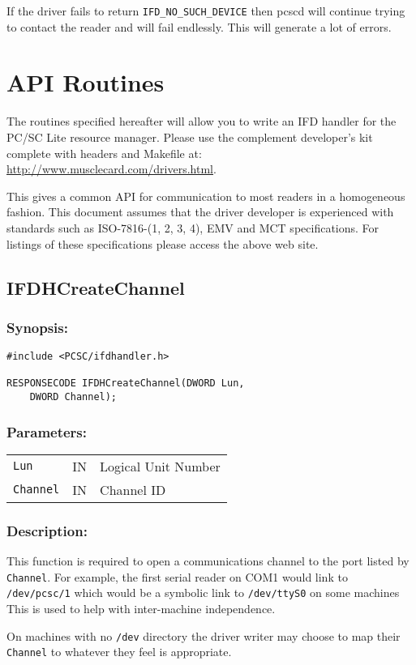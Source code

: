 \documentclass[a4paper,12pt]{article}
\newcommand{\synopsis}{\subsubsection{Synopsis:}}
\newcommand{\parameters}{\subsubsection{Parameters:}}
\newcommand{\desc}{\subsubsection{Description:}}
\begin{document}
If the driver fails to return \texttt{IFD\_NO\_SUCH\_DEVICE} then pcscd
will continue trying to contact the reader and will fail endlessly. This
will generate a lot of errors.


\section{API Routines}

The routines specified hereafter will allow you to write an IFD handler
for the PC/SC Lite resource manager. Please use the complement
developer's kit complete with headers and Makefile at:
\url{http://www.musclecard.com/drivers.html}.

This gives a common API for communication to most readers in a
homogeneous fashion. This document assumes that the driver developer is
experienced with standards such as ISO-7816-(1, 2, 3, 4), EMV and MCT
specifications. For listings of these specifications please access the
above web site.


\subsection{IFDHCreateChannel}

\synopsis

\begin{verbatim}
#include <PCSC/ifdhandler.h>

RESPONSECODE IFDHCreateChannel(DWORD Lun,
    DWORD Channel);
\end{verbatim}

\parameters

\begin{tabular}{lll}
\texttt{Lun} & IN & Logical Unit Number \\
\texttt{Channel} & IN & Channel ID \\
\end{tabular}

\desc

This function is required to open a communications channel to the port
listed by \texttt{Channel}. For example, the first serial reader on COM1
would link to \texttt{/dev/pcsc/1} which would be a symbolic link to
\texttt{/dev/ttyS0} on some machines This is used to help with
inter-machine independence.

On machines with no \texttt{/dev} directory the driver writer may choose to
map their \texttt{Channel} to whatever they feel is appropriate.
\end{document}
